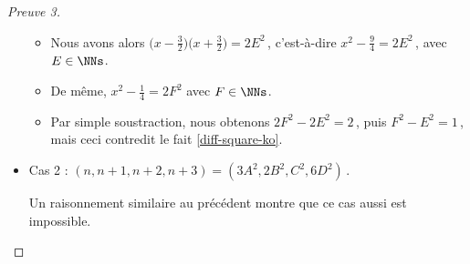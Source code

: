\begin{proof}[Preuve 3]
\begin{itemize}
\begin{itemize}
        	\item Nous avons alors
        	$\big( x - \frac32 \big) \big( x + \frac32 \big) = 2 E^2$\,, c'est-à-dire $x^2 - \frac94 = 2 E^2$\,, avec $E \in \NNs$.
        
        	\item De même,
        	$x^2 - \frac14 = 2 F^2$ avec $F \in \NNs$.	
        
        	\item Par simple soustraction, nous obtenons $2 F^2 - 2 E^2 = 2$\,, puis $F^2 - E^2 = 1$\,, mais ceci contredit le fait \ref{diff-square-ko}.
        \end{itemize}
    	
	
		\item Cas 2 : $(n, n+1, n+2, n+3) = (3A^2, 2B^2, C^2, 6D^2)$\,.
		
		\smallskip
		\noindent
		Un raisonnement similaire au précédent montre que ce cas aussi est impossible. \qedhere
    \end{itemize}
\end{proof}

